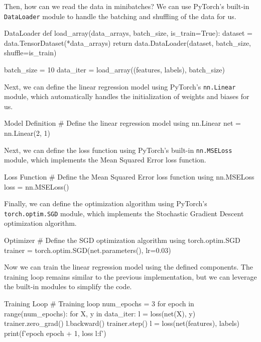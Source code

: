 Then, how can we read the data in minibatches? We can use PyTorch's built-in \texttt{DataLoader} module to handle the batching and shuffling of the data for us.

\begin{pythoncode}{DataLoader}
def load_array(data_arrays, batch_size, is_train=True):
    dataset = data.TensorDataset(*data_arrays)
    return data.DataLoader(dataset, batch_size, shuffle=is_train)

batch_size = 10
data_iter = load_array((features, labels), batch_size)
\end{pythoncode}

Next, we can define the linear regression model using PyTorch's \texttt{nn.Linear} module, which automatically handles the initialization of weights and biases for us.

\begin{pythoncode}{Model Definition}
# Define the linear regression model using nn.Linear
net = nn.Linear(2, 1)
\end{pythoncode}

Next, we can define the loss function using PyTorch's built-in \texttt{nn.MSELoss} module, which implements the Mean Squared Error loss function.
\begin{pythoncode}{Loss Function}
# Define the Mean Squared Error loss function using nn.MSELoss
loss = nn.MSELoss()
\end{pythoncode}

Finally, we can define the optimization algorithm using PyTorch's \texttt{torch.optim.SGD} module, which implements the Stochastic Gradient Descent optimization algorithm.
\begin{pythoncode}{Optimizer}
# Define the SGD optimization algorithm using torch.optim.SGD
trainer = torch.optim.SGD(net.parameters(), lr=0.03)
\end{pythoncode}

Now we can train the linear regression model using the defined components. The training loop remains similar to the previous implementation, but we can leverage the built-in modules to simplify the code.
\begin{pythoncode}{Training Loop}
# Training loop
num_epochs = 3
for epoch in range(num_epochs):
    for X, y in data_iter:
        l = loss(net(X), y)
        trainer.zero_grad()
        l.backward()
        trainer.step()
    l = loss(net(features), labels)
    print(f'epoch {epoch + 1}, loss {l:f}')
\end{pythoncode}

